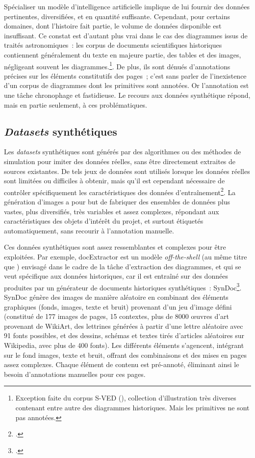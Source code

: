 Spécialiser un modèle d'intelligence artificielle implique de lui
fournir des données pertinentes, diversifiées, et en quantité
suffisante. Cependant, pour certains domaines, dont l'histoire fait
partie, le volume de données disponible est insuffisant. Ce constat est
d'autant plus vrai dans le cas des diagrammes issus de traités
astronomiques~: les corpus de documents scientifiques historiques
contiennent généralement du texte en majeure partie, des tables et des
images, négligeant souvent les diagrammes.\footnote{Exception faite du
  corpus S-VED (\cite{buttner_cordeep_2022}), collection
  d'illustration très diverses contenant entre autre des diagrammes
  historiques. Mais les primitives ne sont pas annotées.}. De plus, ils
sont dénués d'annotations précises sur les éléments constitutifs des
pages~; c'est sans parler de l'inexistence d'un corpus de diagrammes
dont les primitives sont annotées. Or l'annotation est une tâche
chronophage et fastidieuse. Le recours aux données synthétique répond,
mais en partie seulement, à ces problématiques.

\hypertarget{datasets-synthetiques}{%
\subsection{\emph{Datasets} synthétiques}\label{datasets-synthetiques}}

Les \textit{datasets} synthétiques sont générés par des algorithmes ou des
méthodes de simulation pour imiter des données réelles, sans être
directement extraites de sources existantes. De tels jeux de données
sont utilisés lorsque les données réelles sont limitées ou difficiles à
obtenir, mais qu'il est cependant nécessaire de contrôler spécifiquement
les caractéristiques des données d'entraînement\footcite{buttner_cordeep_2022}. La génération
d'images a pour but de fabriquer des ensembles de données plus vastes,
plus diversifiés, très variables et assez complexes, répondant aux
caractéristiques des objets d'intérêt du projet, et surtout étiquetés
automatiquement, sans recourir à l'annotation manuelle.

Ces données synthétiques sont assez ressemblantes et complexes pour être
exploitées. Par exemple, docExtractor est un modèle \textit{off-the-shell} (au
même titre que \yolo) envisagé dans le cadre de la tâche d'extraction des
diagrammes, et qui se veut spécifique aux données historiques, car il
est entraîné sur des données produites par un générateur de documents
historiques synthétiques~: SynDoc\footcite{monnier_docextractor_2020}. SynDoc
génère des images de manière aléatoire en combinant des éléments
graphiques (fonds, images, texte et bruit) provenant d'un jeu d'image
défini (constitué de 177 images de pages, 15 contextes, plus de 8000
œuvres d'art provenant de WikiArt, des lettrines générées à partir d'une
lettre aléatoire avec 91 fonts possibles, et des dessins, schémas et
textes tirés d'articles aléatoires sur Wikipedia, avec plus de 400
fonts). Les différents éléments s'agencent, intégrant sur le fond
images, texte et bruit, offrant des combinaisons et des mises en pages
assez complexes. Chaque élément de contenu est pré-annoté, éliminant
ainsi le besoin d'annotations manuelles pour ces pages.

